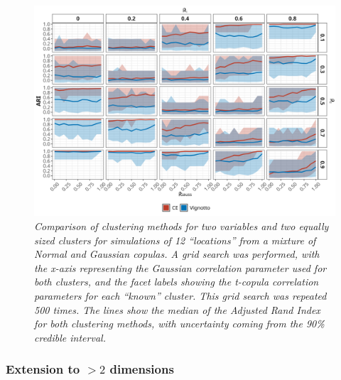 \documentclass{article}
\numberwithin{equation}{section}
\begin{document}
\begin{figure}[H]
    \centering
    \includegraphics[width = 0.9\linewidth]{plots/sim_01b_ce_vs_vi_dqu_0.9.png}
    \caption{\emph{Comparison of clustering methods for two variables and two equally sized clusters for simulations of 12 ``locations'' from a mixture of Normal and Gaussian copulas. A grid search was performed,  with the x-axis representing the Gaussian correlation parameter used for both clusters, and the facet labels showing the t-copula correlation parameters for each ``known'' cluster. This grid search was repeated 500 times. The lines show the median of the Adjusted Rand Index for both clustering methods, with uncertainty coming from the 90\% credible interval.}} %
    \label{fig:01_ce_vs_vi}
\end{figure}


\subsubsection{Extension to $>2$ dimensions} \label{subsubsec:sim_extension}

\end{document}
